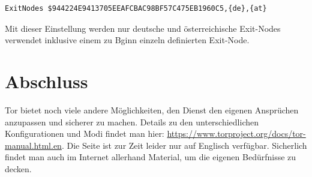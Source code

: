 \begin{lstlisting}
ExitNodes $944224E9413705EEAFCBAC98BF57C475EB1960C5,{de},{at}
\end{lstlisting}

Mit dieser Einstellung werden nur deutsche und österreichische Exit-Nodes verwendet inklusive einem zu Bginn einzeln definierten Exit-Node.

\section{Abschluss}
Tor bietet noch viele andere Möglichkeiten, den Dienst den eigenen Ansprüchen anzupassen und sicherer zu machen. Details zu den unterschiedlichen Konfigurationen und Modi findet man hier: \url{https://www.torproject.org/docs/tor-manual.html.en}. Die Seite ist zur Zeit leider nur auf Englisch verfügbar. Sicherlich findet man auch im Internet allerhand Material, um die eigenen Bedürfnisse zu decken.